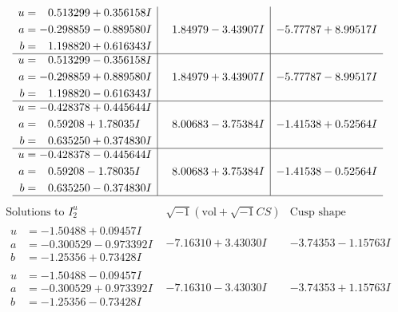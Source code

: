 \documentclass[1p]{elsarticle_modified}
\theoremstyle{definition}
\newcommand{\I}{\sqrt{-1}}
\begin{document}
$$\begin{array}{c|c|c}
\begin{aligned}
u &= \phantom{-}0.513299 + 0.356158 I \\
a &= -0.298859 - 0.889580 I \\
b &= \phantom{-}1.198820 + 0.616343 I\end{aligned}
 & \phantom{-}1.84979 - 3.43907 I & -5.77787 + 8.99517 I \\ \hline\begin{aligned}
u &= \phantom{-}0.513299 - 0.356158 I \\
a &= -0.298859 + 0.889580 I \\
b &= \phantom{-}1.198820 - 0.616343 I\end{aligned}
 & \phantom{-}1.84979 + 3.43907 I & -5.77787 - 8.99517 I \\ \hline\begin{aligned}
u &= -0.428378 + 0.445644 I \\
a &= \phantom{-}0.59208 + 1.78035 I \\
b &= \phantom{-}0.635250 + 0.374830 I\end{aligned}
 & \phantom{-}8.00683 - 3.75384 I & -1.41538 + 0.52564 I \\ \hline\begin{aligned}
u &= -0.428378 - 0.445644 I \\
a &= \phantom{-}0.59208 - 1.78035 I \\
b &= \phantom{-}0.635250 - 0.374830 I\end{aligned}
 & \phantom{-}8.00683 + 3.75384 I & -1.41538 - 0.52564 I\\
 \hline 
 \end{array}$$\newpage$$\begin{array}{c|c|c}  
\text{Solutions to }I^u_{2}& \I (\text{vol} + \sqrt{-1}CS) & \text{Cusp shape}\\
 \hline 
\begin{aligned}
u &= -1.50488 + 0.09457 I \\
a &= -0.300529 - 0.973392 I \\
b &= -1.25356 + 0.73428 I\end{aligned}
 & -7.16310 + 3.43030 I & -3.74353 - 1.15763 I \\ \hline\begin{aligned}
u &= -1.50488 - 0.09457 I \\
a &= -0.300529 + 0.973392 I \\
b &= -1.25356 - 0.73428 I\end{aligned}
 & -7.16310 - 3.43030 I & -3.74353 + 1.15763 I \\ \hline\begin{aligned}

\end{aligned}
\end{array}$$
\end{document}
